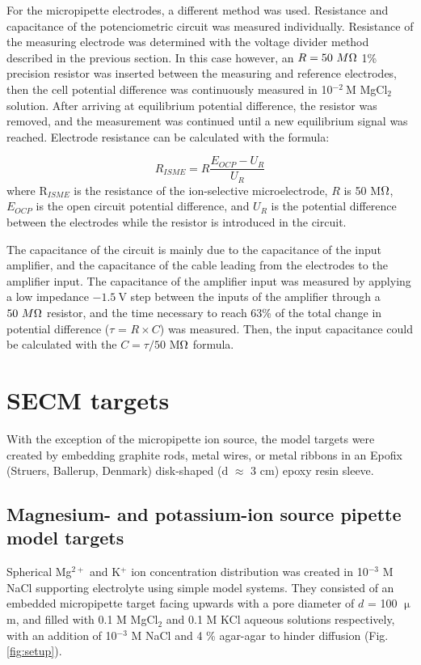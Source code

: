 For the micropipette electrodes, a different method was used.
Resistance and capacitance of the potenciometric circuit was measured individually.
Resistance of the measuring electrode was determined with the voltage divider method described in the previous section.
In this case however, an $R = 50~M\ohm$ 1\% precision resistor was inserted between the measuring and reference electrodes, then the cell potential difference was continuously measured in 10$^{-2}~$M MgCl$_2$ solution.
After arriving at equilibrium potential difference, the resistor was removed, and the measurement was continued until a new equilibrium signal was reached.
Electrode resistance can be calculated with the formula:

\begin{equation}
\label{eq:divider}
        R_{ISME}
        =
        R
        \frac
                {E_{OCP} - U_{R}}
                {U_{R}}
\end{equation}
where R$_{ISME}$ is the resistance of the ion-selective microelectrode, $R$ is 50 M$\ohm$, $E_{OCP}$ is the open circuit potential difference, and $U_{R}$ is the potential difference between the electrodes while the resistor is introduced in the circuit.

The capacitance of the circuit is mainly due to the capacitance of the input amplifier, and the capacitance of the cable leading from the electrodes to the amplifier input.
The capacitance of the amplifier input was measured by applying a low impedance $-1.5~$V step between the inputs of the amplifier through a $50~M\ohm$ resistor, and the time necessary to reach 63\% of the total change in potential difference ($\tau$ = $R\times C$) was measured.
Then, the input capacitance could be calculated with the $C = \tau/50$ M$\ohm$ formula.
		
	\section{SECM targets}
With the exception of the micropipette ion source, the model targets were created by embedding graphite rods, metal wires, or metal ribbons in an Epofix (Struers, Ballerup, Denmark) disk-shaped (d $\approx$ 3 cm) epoxy resin sleeve.
 
	\subsection{Magnesium- and potassium-ion source pipette model targets}
Spherical Mg$^{2+}$ and K$^+$ ion concentration distribution was created in 10$^{-3}$ M NaCl supporting electrolyte using simple model systems.
They consisted of an embedded micropipette target facing upwards with a pore diameter of $d$ = 100 $\upmu$m, and filled with 0.1 M MgCl$_2$ and 0.1 M KCl aqueous solutions respectively, with an addition of 10$^{-3}$ M NaCl and 4 \% agar-agar to hinder diffusion (Fig. \ref{fig:setup}).


